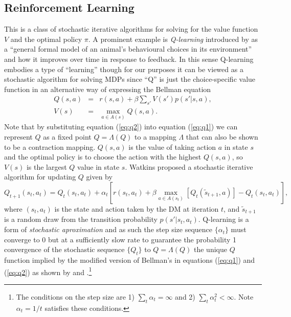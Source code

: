 \subsection{Reinforcement Learning}

This is a class of stochastic iterative algorithms for solving for the value function $V$ and the optimal
policy $\pi$.  A prominent example is {\it Q-learning\/} introduced by \citet{Watkins:1989} as a ``general
formal model of an animal's behavioural choices in its environment'' and how it improves over time in response to feedback.
In this sense Q-learning embodies a type of ``learning'' though for our purposes  it can be viewed as a stochastic algorithm
for solving MDPs since ``Q'' is just the choice-specific value function in an alternative way of expressing the Bellman equation
\begin{eqnarray}
      Q(s,a) &=& r(s,a) + \beta \sum_{s'} V(s')p(s'|s,a), \label{eq:q1}   \\
      V(s) &=& \max_{a \in A(s)} Q(s,a).
\label{eq:q2}
\end{eqnarray}
Note that by substituting equation (\ref{eq:q2}) into equation (\ref{eq:q1}) we can represent $Q$ as a fixed point $Q=\Lambda(Q)$ to a mapping $\Lambda$ that
can also be shown to be a contraction mapping. 
$Q(s,a)$ is the value of taking action $a$ in state $s$ and the optimal policy is to choose the action with the highest $Q(s,a)$, 
so $V(s)$ is the largest $Q$ value in state $s$. Watkins proposed a stochastic iterative algorithm for updating $Q$ given by
\begin{equation}
   Q_{t+1}(s_t,a_t)= Q_t(s_t,a_t) + \alpha_t \left[ r(s_t,a_t)+\beta \max_{a \in A(s_t)}[Q_t(\tilde s_{t+1},a)] - Q_t(s_t,a_t) \right],
\label{eq:qlearning}
\end{equation}
where $(s_t,a_t)$ is the state and action taken by the DM at iteration $t$, and $\tilde s_{t+1}$ is a random draw from the transition probability
$p(s'|s_t,a_t)$. Q-learning is a form of {\it stochastic aproximation\/} \citet{robbinsmunro:1951} and as such 
the step size sequence $\{\alpha_t\}$ must converge to 0 but at a sufficiently slow rate to guarantee the probability 1 convergence
of the stochastic sequence $\{Q_t\}$ to $Q=\Lambda(Q)$ the unique $Q$ function implied by the modified version of Bellman's in  equations (\ref{eq:q1}) and (\ref{eq:q2}) 
as shown by \citet{DayanWatkins:1992} and \citet{Tsitsiklis:1994}.\footnote{\footnotesize The conditions on the step size are 1) $\sum_t \alpha_t = \infty$
and 2) $\sum_t \alpha_t^2 < \infty$. Note $\alpha_t=1/t$ satisfies these conditions.}

